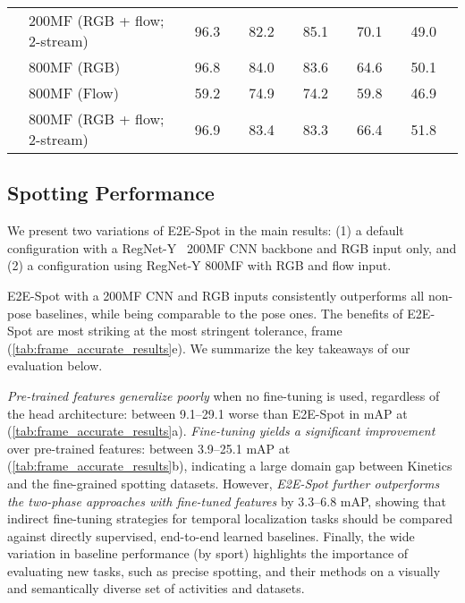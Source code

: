 \documentclass[runningheads]{llncs}
\newcommand{\OURMETHOD}{{E2E-Spot}\xspace}
\newcommand{\nms}{\textsuperscript{\textdagger}}
\begin{document}
\begin{table*}[t]
{\begin{tabularx}{\textwidth}{ll rr rr rr rr rr}
        & 200MF (RGB + flow; 2-stream)
            & \nms 96.3 & 
            & \nms 82.2 & 
            & \nms 85.1 & 
            & \nms 70.1 & 
            & \nms 49.0 &  \\
        \cmidrule{2-12}
        & 800MF (RGB)
            & 96.8 &  
            & \nms 84.0 & 
            & \nms 83.6 & 
            & 64.6 & 
            & \nms 50.1 &  \\
        & 800MF (Flow)
            & \nms 59.2 & 
            & \nms 74.9 & 
            & \nms 74.2 & 
            & \nms 59.8 & 
            & \nms 46.9 &  \\
        & 800MF (RGB + flow; 2-stream)
            & \nms 96.9 & 
            & \nms 83.4 & 
            & \nms 83.3 & 
            & \nms 66.4 & 
            & \nms 51.8 &  \\
        \bottomrule
    \end{tabularx}
    }
\end{table*}
 
\subsection{Spotting Performance}
\label{sec:performance}

We present two variations of \OURMETHOD in the main results: (1) a default configuration with a RegNet-Y~\cite{regnet} 200MF CNN backbone and RGB input only, and (2) a configuration using RegNet-Y 800MF with RGB and flow input.

\OURMETHOD with a 200MF CNN and RGB inputs consistently outperforms all non-pose baselines, while being comparable to the pose ones.
The benefits of \OURMETHOD are most striking at the most stringent
tolerance,  frame (\autoref{tab:frame_accurate_results}e).
We summarize the key takeaways of our evaluation below.

\textit{Pre-trained features generalize poorly} when no
fine-tuning is used, regardless of the head architecture: between 9.1--29.1 worse than \OURMETHOD in mAP at  (\autoref{tab:frame_accurate_results}a).
\textit{Fine-tuning yields a significant improvement} over pre-trained features: between 3.9--25.1 mAP at  (\autoref{tab:frame_accurate_results}b), indicating a large domain gap between Kinetics and the fine-grained spotting datasets.
However, \textit{\OURMETHOD further outperforms the two-phase approaches with fine-tuned features} by 3.3--6.8 mAP, showing that indirect fine-tuning strategies for temporal localization tasks should be compared against directly supervised, end-to-end learned baselines.
Finally, the wide variation in baseline performance (by sport) highlights the importance of evaluating new tasks, such as precise spotting, and their methods on a visually and semantically diverse set of activities and datasets.
\end{document}
